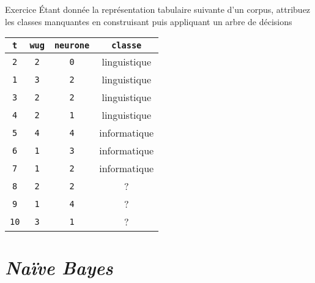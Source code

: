 \documentclass[../allslides.tex]{subfiles}
\begin{document}
\renewcommand\docdate{2021-02-18}  %



\begin{frame}[fragile=singleslide]{Exercice}
	Étant donnée la représentation tabulaire suivante d'un corpus, attribuez les classes manquantes en construisant puis appliquant un arbre de décisions
	\begin{table}
		\begin{tabular}{*{4}{c}}
			\toprule
			\texttt{t}	& \texttt{wug}	& \texttt{neurone}	& \texttt{classe}\\
			\midrule
			\texttt{2}	& \texttt{2}	& \texttt{0}	& linguistique\\
			\texttt{1}	& \texttt{3}	& \texttt{2}	& linguistique\\
			\texttt{3}	& \texttt{2}	& \texttt{2}	& linguistique\\
			\texttt{4}	& \texttt{2}	& \texttt{1}	& linguistique\\
			\texttt{5}	& \texttt{4}	& \texttt{4}	& informatique\\
			\texttt{6}	& \texttt{1}	& \texttt{3}	& informatique\\
			\texttt{7}	& \texttt{1}	& \texttt{2}	& informatique\\
			\texttt{8}	& \texttt{2}	& \texttt{2}	& ?\\
			\texttt{9}	& \texttt{1}	& \texttt{4}	& ?\\
			\texttt{10}	& \texttt{3}	& \texttt{1}	& ?\\
			\bottomrule
		\end{tabular}
	\end{table}
\end{frame}

%

\section{\emph{Naïve Bayes}}
\end{document}
